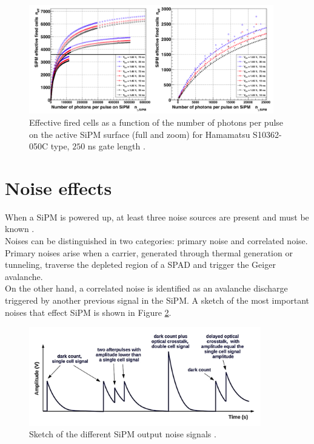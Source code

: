 \begin{figure}
	\centering
	\includegraphics[width=0.95\textwidth]{IMG/Cap3/occupancy.png}
	\caption{Effective fired cells as a function of the number of photons per pulse on the active SiPM surface (full and zoom) for Hamamatsu S10362-050C type, $250$ ns gate length \cite{occupancy}.}
	\label{fig:occupancy}
\end{figure}

\section{Noise effects}\label{subsec:noise}
When a SiPM is powered up, at least three noise sources are present and must be known \cite{electrics}.\\
Noises can be distinguished in two categories: primary noise and correlated noise. Primary noises arise when a carrier, generated through thermal generation or tunneling, traverse the depleted region of a SPAD and trigger the Geiger avalanche.\\
On the other hand, a correlated noise is identified as an avalanche discharge triggered by another previous signal in the SiPM.
A sketch of the most important noises that effect SiPM is shown in Figure \ref{fig:sipm_noises}.

\begin{figure}
	\centering
	\includegraphics[width=0.9\textwidth]{IMG/Cap3/sipm_noises.png}
	\caption{Sketch of the different SiPM output noise signals \cite{APD_new_ph}.}
	\label{fig:sipm_noises}
\end{figure}

